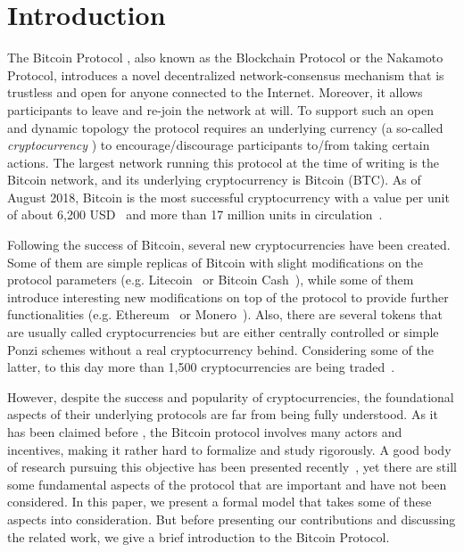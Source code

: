 
\section{Introduction}

The Bitcoin Protocol \cite{Bitcoin,DBLP:books/daglib/0040621,NC17}, also known as the Blockchain Protocol or the Nakamoto Protocol, introduces a novel decentralized network-consensus mechanism that is trustless 
and open for anyone connected to the Internet. Moreover, it allows participants to leave and re-join the network at will. To support such an open and dynamic topology the protocol requires an underlying currency (a so-called \emph{cryptocurrency} \cite{NC17}) to encourage/discourage participants to/from taking certain actions. The largest network running this protocol at the time of writing is the Bitcoin network, and its underlying cryptocurrency is Bitcoin (BTC). As of August 2018, Bitcoin is the most successful cryptocurrency with a value per unit of about 6,200 USD~\cite{BitcoinPrice} and more than 17 million units in circulation~\cite{Totalcoins}.
 
Following the success of Bitcoin, several new cryptocurrencies have been created. Some of them are simple replicas of Bitcoin with slight modifications on the protocol parameters (e.g. Litecoin~\cite{Litecoin} or Bitcoin Cash~\cite{Bcash}), while some of them introduce interesting new modifications on top of the protocol to provide further functionalities (e.g. Ethereum~\cite{Ethereum,E17} or Monero~\cite{Monero}). Also, there are several tokens that are usually called cryptocurrencies but are either centrally controlled or simple Ponzi schemes without a real cryptocurrency behind.
Considering some of the latter, to this day more than 1,500 cryptocurrencies are being traded~\cite{coinmarketcap}.

However, despite the success and popularity of cryptocurrencies, the foundational aspects of their underlying protocols are far from being fully understood. As it has been claimed before \cite{mininggames:2016}, the Bitcoin protocol involves many actors and incentives, making it rather hard to formalize and study rigorously. A good body of research pursuing this objective has been presented recently~\cite{mininggames:2016,optimalselfishmining2017,instabilitywithoutreward:2016,selfishmining2014,stop_selfish_mining2014,eclipseattacks2015,LBSZR15,LJG15,stubborn_mining:2016,economics_of_mining2013,ZGR17,ABLZ17,MHG18,SZWTK18}, 
yet there are still some fundamental aspects of the protocol that are important and have not been considered. 
In this paper, we present a formal model that takes some of these aspects into consideration. But before presenting our contributions and discussing the related work, we give a brief introduction to the Bitcoin Protocol.

